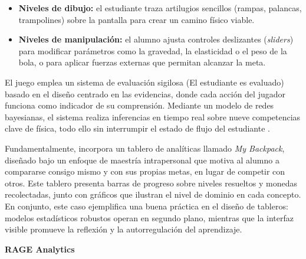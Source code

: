 \begin{itemize}
	
	\item \textbf{Niveles de dibujo:} el estudiante traza artilugios sencillos (rampas, palancas, trampolines) sobre la pantalla para crear un camino físico viable.
	
	\item \textbf{Niveles de manipulación:} el alumno ajusta controles deslizantes (\textit{sliders}) para modificar parámetros como la gravedad, la elasticidad o el peso de la bola, o para aplicar fuerzas externas que permitan alcanzar la meta.
	
\end{itemize}

El juego emplea un sistema de evaluación sigilosa (El estudiante es evaluado) basado en el diseño centrado en las evidencias, donde cada acción del jugador funciona como indicador de su comprensión. Mediante un modelo de redes bayesianas, el sistema realiza inferencias en tiempo real sobre nueve competencias clave de física, todo ello sin interrumpir el estado de flujo del estudiante \cite{shute_stealth_2011, mislevy_evidence_2003}.

Fundamentalmente, incorpora un tablero de analíticas llamado \textit{My Backpack}, diseñado bajo un enfoque de maestría intrapersonal que motiva al alumno a compararse consigo mismo y con sus propias metas, en lugar de competir con otros. Este tablero presenta barras de progreso sobre niveles resueltos y monedas recolectadas, junto con gráficos que ilustran el nivel de dominio en cada concepto. En conjunto, este caso ejemplifica una buena práctica en el diseño de tableros: modelos estadísticos robustos operan en segundo plano, mientras que la interfaz visible promueve la reflexión y la autorregulación del aprendizaje.

\textbf{RAGE Analytics}

